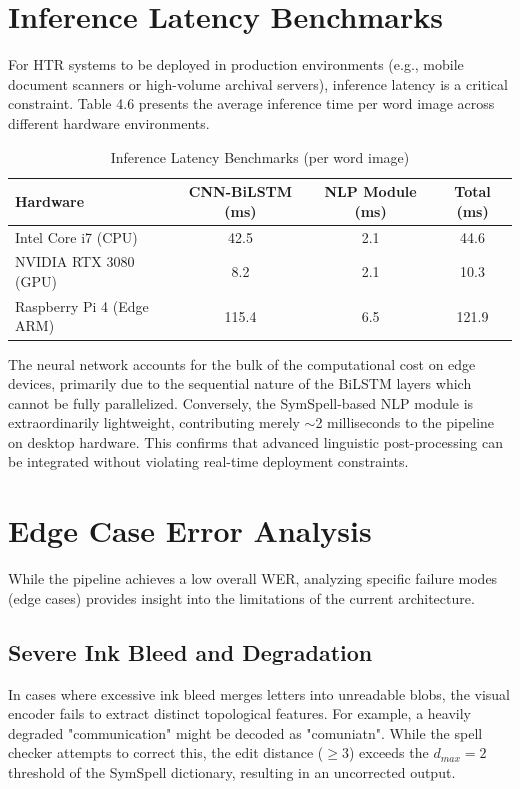 \section{Inference Latency Benchmarks}
For HTR systems to be deployed in production environments (e.g., mobile document scanners or high-volume archival servers), inference latency is a critical constraint. Table 4.6 presents the average inference time per word image across different hardware environments.

\begin{table}[h!]
\centering
\caption{Inference Latency Benchmarks (per word image)}
\label{tab:latency}
\begin{tabular}{lccc}
    \toprule
    \textbf{Hardware} & \textbf{CNN-BiLSTM (ms)} & \textbf{NLP Module (ms)} & \textbf{Total (ms)} \\
    \midrule
    Intel Core i7 (CPU) & 42.5 & 2.1 & 44.6 \\
    NVIDIA RTX 3080 (GPU) & 8.2 & 2.1 & 10.3 \\
    Raspberry Pi 4 (Edge ARM) & 115.4 & 6.5 & 121.9 \\
    \bottomrule
\end{tabular}
\end{table}

The neural network accounts for the bulk of the computational cost on edge devices, primarily due to the sequential nature of the BiLSTM layers which cannot be fully parallelized. Conversely, the SymSpell-based NLP module is extraordinarily lightweight, contributing merely $\sim$2 milliseconds to the pipeline on desktop hardware. This confirms that advanced linguistic post-processing can be integrated without violating real-time deployment constraints.

\section{Edge Case Error Analysis}
While the pipeline achieves a low overall WER, analyzing specific failure modes (edge cases) provides insight into the limitations of the current architecture.

\subsection{Severe Ink Bleed and Degradation}
In cases where excessive ink bleed merges letters into unreadable blobs, the visual encoder fails to extract distinct topological features. For example, a heavily degraded "communication" might be decoded as "comuniatn". While the spell checker attempts to correct this, the edit distance ($\ge 3$) exceeds the $d_{max} = 2$ threshold of the SymSpell dictionary, resulting in an uncorrected output.

